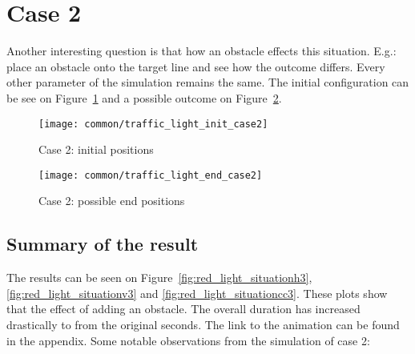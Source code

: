 		\section{Case 2}
			Another interesting question is that how an obstacle effects this situation. E.g.: place an obstacle onto the target line and see how the outcome differs. Every other parameter of the simulation remains the same. The initial configuration can be see on Figure~\ref{fig:traffic_light_init2} and a possible outcome on Figure~\ref{fig:traffic_light_end2}.
			\begin{figure}
				\centering
				\texttt{[image: common/traffic\_light\_init\_case2]}
				\caption{Case 2: initial positions}
				\label{fig:traffic_light_init2}
			\end{figure}
			\begin{figure}
				\centering
				\texttt{[image: common/traffic\_light\_end\_case2]}
				\caption{Case 2: possible end positions}
				\label{fig:traffic_light_end2}
			\end{figure}
			\subsection*{Summary of the result}
			The results can be seen on Figure~\ref{fig:red_light_situationh3}, \ref{fig:red_light_situationv3} and \ref{fig:red_light_situationcc3}. These plots show that the effect of adding an obstacle. The overall duration has increased drastically to from the original seconds. The link to the animation can be found in the appendix.
			Some notable observations from the simulation of case 2:
			
